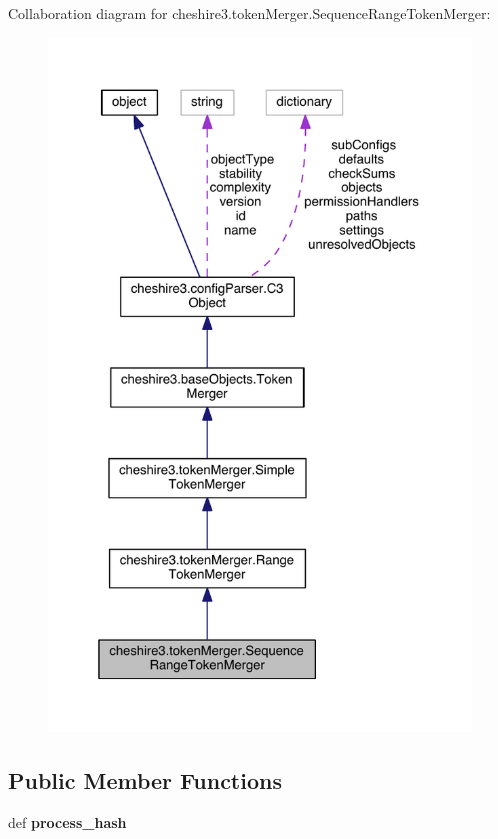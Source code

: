Collaboration diagram for cheshire3.\-token\-Merger.\-Sequence\-Range\-Token\-Merger\-:
\nopagebreak
\begin{figure}[H]
\begin{center}
\leavevmode
\includegraphics[width=327pt]{classcheshire3_1_1token_merger_1_1_sequence_range_token_merger__coll__graph}
\end{center}
\end{figure}
\subsection*{Public Member Functions}
\begin{DoxyCompactItemize}
\item 
\hypertarget{classcheshire3_1_1token_merger_1_1_sequence_range_token_merger_a76c00ed295a110c87150a25a72d2bfcd}{def {\bfseries process\-\_\-hash}}\label{classcheshire3_1_1token_merger_1_1_sequence_range_token_merger_a76c00ed295a110c87150a25a72d2bfcd}

\end{DoxyCompactItemize}
